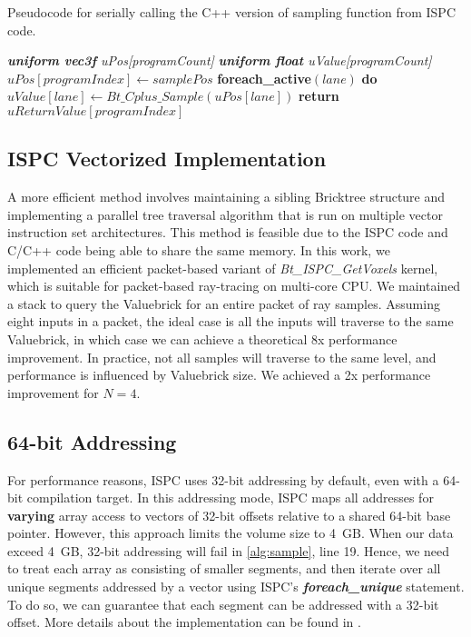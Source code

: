 \begin{algorithm}
	\caption{Pseudocode for serially calling the C++ version of sampling function from ISPC code. }\label{alg:ispc_sample}
	\begin{algorithmic}[1]
        	\State \textit{\textbf{uniform vec3f} uPos[programCount]}
            \State \textit{\textbf{uniform float} uValue[programCount]}
            \State $uPos[programIndex] \gets samplePos$
            \State \textbf{foreach\_active}$(lane)$ \textbf{do}
            	\State \ \ \ \ $uValue[lane] \gets Bt\_Cplus\_Sample(uPos[lane])$
            \State \textbf{return} $uReturnValue[programIndex]$           
    	\EndProcedure
	\end{algorithmic}
\end{algorithm}
\vspace{-1em}


\subsection{ISPC Vectorized Implementation}
A more efficient method involves maintaining a sibling Bricktree structure and 
implementing a parallel tree traversal algorithm that is run on multiple vector
instruction set architectures.
This method is feasible due to the ISPC code and C/C++ code being able to share the same memory.
In this work, we implemented an efficient packet-based variant of 
\textit{Bt\_ISPC\_GetVoxels} kernel, which is suitable for packet-based ray-tracing
on multi-core CPU. We maintained a stack to query the Valuebrick for an entire
packet of ray samples. Assuming eight inputs in a packet, the ideal case is all the inputs will
traverse to the same Valuebrick, in which case we can achieve a theoretical 8x performance
improvement. In practice, not all samples will traverse to the same level,
and performance is influenced by Valuebrick size. We achieved a 2x performance
improvement for $N=4$.


\subsection{64-bit Addressing} 
For performance reasons, ISPC uses 32-bit addressing by default, even with
a 64-bit compilation target. In this addressing mode, ISPC maps all addresses for
\textbf{varying} array access to vectors of 32-bit offsets relative to a shared
64-bit base pointer. However, this approach limits the volume size to 4~GB.
When our data exceed 4~GB, 32-bit addressing will fail in \cref{alg:sample},
line 19. Hence, we need to treat each array as consisting of smaller
segments, and then iterate over all unique segments addressed by a vector using
ISPC's \textbf{\textit{foreach\_unique}} statement. To do so, we can guarantee 
that each segment can be addressed with a 32-bit offset. More details about
the implementation can be found in \cite{wald_2018}. 

